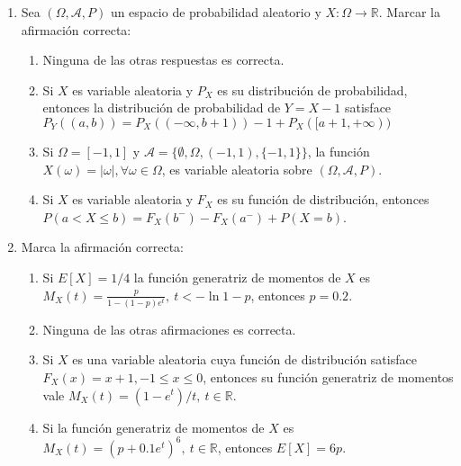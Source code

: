 \documentclass[fleqn]{article}
\begin{document}

\begin{enumerate}

  \item Sea $(\Omega, \mathcal{A}, P)$ un espacio de probabilidad aleatorio y $X : \Omega \to \mathbb{R}$. Marcar la afirmación correcta:

        \begin{enumerate}
          \item Ninguna de las otras respuestas es correcta.
          \item Si $X$ es variable aleatoria y $P_X$ es su distribución de probabilidad, entonces la distribución de probabilidad de $Y = X - 1$ satisface
                $P_Y((a, b)) = P_X((-\infty, b + 1)) - 1 + P_X([a + 1, +\infty))$
          \item Si $\Omega = [-1, 1]$ y $\mathcal{A} = \{\emptyset, \Omega, (-1, 1), \{-1, 1\}\}$, la función $X(\omega) = |\omega|, \forall\omega \in \Omega$, es variable aleatoria sobre $(\Omega, \mathcal{A}, P)$.
          \item Si $X$ es variable aleatoria y $F_X$ es su función de distribución, entonces \linebreak
                $P(a < X \le b) = F_X(b^-) - F_X(a^-) + P(X = b)$.
        \end{enumerate}

  \item Marca la afirmación correcta:

        \begin{enumerate}
          \item Si $E[X] = 1/4$ la función generatriz de momentos de $X$ es $M_X(t) = \frac{p}{1 - (1 - p)e^t},\ t < -\ln{1 - p}$, entonces $p = 0.2$.
          \item Ninguna de las otras afirmaciones es correcta.
          \item Si $X$ es una variable aleatoria cuya función de distribución satisface $F_X(x) = x + 1, -1 \le x \le 0$, entonces su función generatriz de momentos vale $M_X(t) = (1 - e^t)/t,\ t \in \mathbb{R}$.
          \item Si la función generatriz de momentos de $X$ es $M_X(t) = (p + 0.1e^t)^6,\ t \in \mathbb{R}$, entonces $E[X] = 6p$.
        \end{enumerate}


\end{enumerate}
\end{document}
